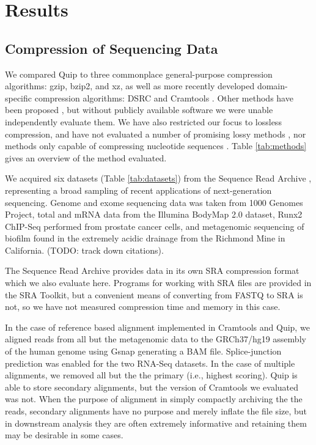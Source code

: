 \documentclass[twocolumn]{article}
\begin{document}
\section{Results}
\label{section:results}

\subsection{Compression of Sequencing Data}


We compared Quip to three commonplace general-purpose compression algorithms:
gzip, bzip2, and xz, as well as more recently developed domain-specific
compression algorithms: DSRC \citep{Deorowicz2011} and Cramtools \citep{Hsi-
YangFritz2011}. Other methods have been proposed \citep{Tembe2010,
Kozanitis2011, Bhola2011}, but without publicly available software we were
unable independently evaluate them. We have also restricted our focus to
lossless compression, and have not evaluated a number of promising lossy
methods \citep{Hsi-YangFritz2011,Wan2011,Hach2012}, nor methods only capable
of compressing nucleotide sequences \citep{Cox2012}. Table \ref{tab:methods}
gives an overview of the method evaluated.

We acquired six datasets (Table \ref{tab:datasets}) from the Sequence Read
Archive \citep{Leinonen2011}, representing a broad sampling of recent
applications of next-generation sequencing. Genome and exome sequencing data
was taken from 1000 Genomes Project, total and mRNA data from the Illumina
BodyMap 2.0 dataset, Runx2 ChIP-Seq performed from prostate cancer cells, and
metagenomic sequencing of biofilm found in the extremely acidic drainage from
the Richmond Mine in California. (TODO: track down citations).

The Sequence Read Archive provides data in its own SRA compression format
which we also evaluate here. Programs for working with SRA files are provided
in the SRA Toolkit, but a convenient means of converting from FASTQ to SRA is
not, so we have not measured compression time and memory in this case.


In the case of reference based alignment implemented in Cramtools and Quip, we
aligned reads from all but the metagenomic data to the GRCh37/hg19 assembly of
the human genome using Gsnap generating a BAM file. Splice-junction prediction
was enabled for the two RNA-Seq datasets. In the case of multiple alignments,
we removed all but the the primary (i.e., highest scoring). Quip is able to
store secondary alignments, but the version of Cramtools we evaluated was not.
When the purpose of alignment in simply compactly archiving the the reads,
secondary alignments have no purpose and merely inflate the file size, but in
downstream analysis they are often extremely informative and retaining them
may be desirable in some cases.
\end{document}
